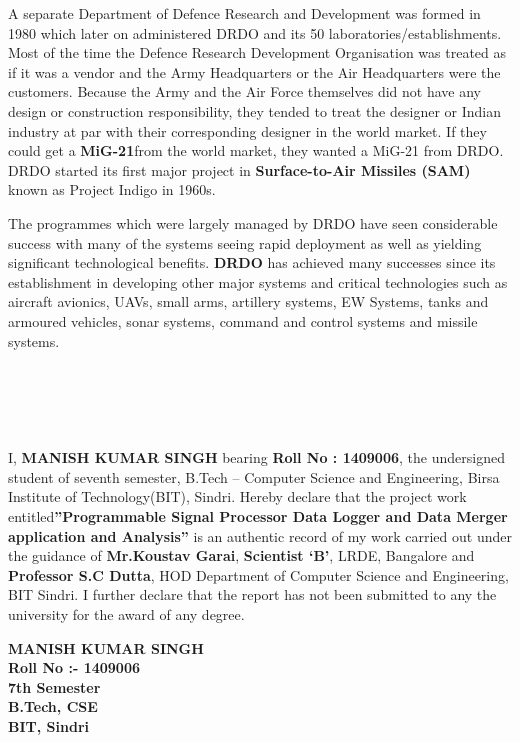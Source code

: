 \documentclass[12pt]{article} %
\begin{document}
  \par            A separate Department of Defence Research and Development was formed in 1980 which later on administered DRDO and its 50 laboratories/establishments. Most of the time the Defence Research Development Organisation was treated as if it was a vendor and the Army Headquarters or the Air Headquarters were the customers. Because the Army and the Air Force themselves did not have any design or construction responsibility, they tended to treat the designer or Indian industry at par with their corresponding designer in the world market. If they could get a \textbf{MiG-21}from the world market, they wanted a MiG-21 from DRDO. DRDO started its first major project in \textbf{Surface-to-Air Missiles (SAM)} known as Project Indigo in 1960s.\\
  \par               The programmes which were largely managed by DRDO have seen considerable success with many of the systems seeing rapid deployment as well as yielding significant technological benefits. \textbf{DRDO} has achieved many successes since its establishment in developing other major systems and critical technologies such as aircraft avionics, UAVs, small arms, artillery systems, EW Systems, tanks and armoured vehicles, sonar systems, command and control systems and missile systems.

\newpage
\thispagestyle{plain}
\section*{\LARGE\bfseries{\\ }}
 I, \textbf{MANISH KUMAR SINGH} bearing \textbf{Roll No : 1409006}, the undersigned student of seventh semester, B.Tech – Computer Science and Engineering, Birsa Institute of Technology(BIT), Sindri. Hereby declare that the project work entitled\textbf{”Programmable Signal Processor Data Logger and Data Merger application and Analysis”} is an authentic record of my work carried out under the guidance of \textbf{Mr.Koustav Garai}, \textbf{Scientist `B'}, LRDE, Bangalore and \textbf{Professor S.C Dutta}, HOD Department of Computer Science and Engineering, BIT Sindri. I further declare that the report has not been submitted to any the university for the award of any degree.
  
  \vspace{2cm}
  \begin{flushright}
 \begin{minipage}[t]{7cm}

\centering
\textbf{ MANISH KUMAR SINGH \\
 Roll No :- 1409006 \\
7th Semester \\
 B.Tech, CSE\\
BIT, Sindri}

 \end{minipage}
 
 \end{flushright}
\end{document}

